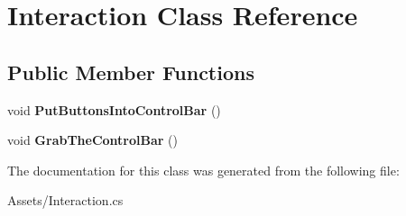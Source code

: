 \hypertarget{classInteraction}{}\section{Interaction Class Reference}
\label{classInteraction}
\subsection*{Public Member Functions}
\begin{DoxyCompactItemize}
\item 
void {\bfseries Put\+Buttons\+Into\+Control\+Bar} ()\hypertarget{classInteraction_a57fcf94768c97512c00ba2b6bbbf4480}{}\label{classInteraction_a57fcf94768c97512c00ba2b6bbbf4480}

\item 
void {\bfseries Grab\+The\+Control\+Bar} ()\hypertarget{classInteraction_a4403de8669ed5cdd0e08abc4741304b6}{}\label{classInteraction_a4403de8669ed5cdd0e08abc4741304b6}

\end{DoxyCompactItemize}


The documentation for this class was generated from the following file\+:\begin{DoxyCompactItemize}
\item 
Assets/Interaction.\+cs\end{DoxyCompactItemize}
